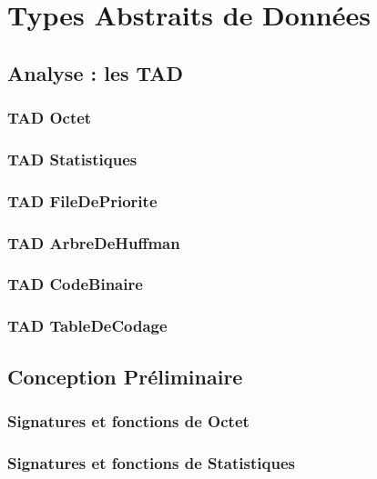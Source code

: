 \documentclass[10pt]{report}
\begin{document}
    \chapter{Types Abstraits de Données}
        \section{Analyse : les TAD}
            \subsection{TAD Octet}
            
            \subsection{TAD Statistiques}
            
            \subsection{TAD FileDePriorite}
            
            \subsection{TAD ArbreDeHuffman}
            
            \subsection{TAD CodeBinaire}
            
            \subsection{TAD TableDeCodage}
            

        \newpage
        \section{Conception Préliminaire}
            \subsection{Signatures et fonctions de Octet}
            
            \subsection{Signatures et fonctions de Statistiques}
            
\end{document}
